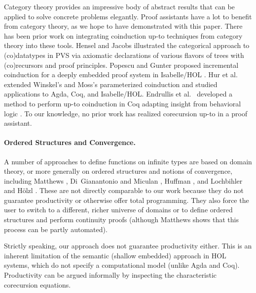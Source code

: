 \documentclass[preprint,draft]
{sigplanconf}
\newcommand{\<}{\langle}
\renewcommand{\>}{\rangle}
\begin{document}
Category theory provides an impressive body of {\relax abstract} results
that can be applied to solve concrete problems elegantly.
Proof assistants have a lot to benefit from category theory, as we hope to have demonstrated
with this paper.
There has been prior work on integrating coinduction up-to techniques from
category theory into these tools. Hensel and Jacobs
\cite{hensel-interatedRecursion} illustrated the categorical approach to
(co)data\-types in PVS via axiomatic declarations of various flavors of
trees with (co)recursors and proof principles. Popescu and Gunter proposed
incremental coinduction for a deeply embedded proof system in Isabelle\slash HOL
\cite{pop-Coind}. Hur et al.\ \cite{HurNDV13} extended Winskel's
\cite{winskel-nu} and Moss's \cite{moss-param} parameterized coinduction and
studied applications to Agda, Coq, and Isabelle\slash HOL. Endrullis et al.\
\cite{endrulis-circ} developed a method to perform up-to coinduction in Coq adapting insight from behavioral logic \cite{circCALCO09theory}.
To our knowledge, no prior work has realized corecursion up-to in a
proof assistant.

\paragraph{Ordered Structures and Convergence.}
A number of approaches to define functions on infinite types are based on domain
theory, or more generally on ordered structures and notions of convergence, including Matthews
\cite{matthews-rec-coind}, Di~Gianantonio and Miculan \cite{miculan-unifying},
Huffman \cite{huffman-2009}, and Lochbihler and H\"olzl
\cite{lochbihler-hoelzl-2014}. These are not directly comparable to our work
because they do not guarantee productivity or otherwise offer total programming.
They also force the user to switch to a different, richer universe of domains or
to define ordered structures and perform continuity proofs (although Matthews
shows that this process can be partly automated).



Strictly speaking, our approach does not guarantee productivity either. This is an
inherent limitation of the semantic
(shallow embedded)
approach in HOL systems, which do not specify a computational model (unlike Agda and Coq).
Productivity can be argued informally by inspecting the characteristic corecursion equations.
\end{document}

